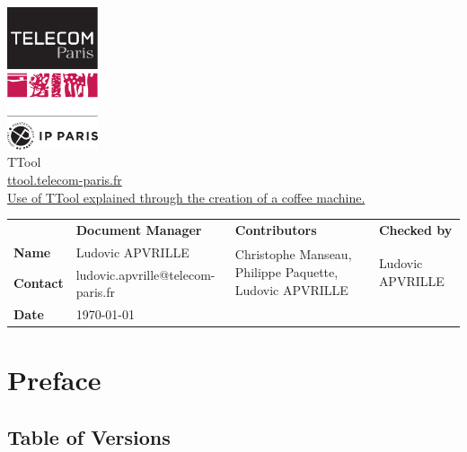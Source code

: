 \documentclass[12pt]{article}
\begin{document}
\sloppy 

\begin{center}

\includegraphics[width=0.2\textwidth]{fig/tp}
\vspace{10 pt}\\
\Huge TTool \\
\vspace{10 pt}
\Large \url{ttool.telecom-paris.fr}
\vspace{20 pt}\\
\underline{\Large Use of TTool explained through the creation of a coffee machine.}
\vspace{30 pt}
\end{center}

\begin{table}[H]
\large
\centering
\begin{adjustbox}{width=\textwidth}
\begin{tabular}{ |p{1.6cm}|p{6.0cm}|p{4.2cm}|p{4.2cm}| }
\hhline{----}
 & \textbf{Document Manager} & \textbf{Contributors}  & \textbf{Checked by}  \\ 
\hhline{----}
\textbf{Name}   & Ludovic APVRILLE & \multirow{2}{4.2cm}{Christophe Manseau, Philippe Paquette,
Ludovic APVRILLE} &
\multirow{2}{*}{Ludovic APVRILLE} \\
\hhline{--~~}
\textbf{Contact} & ludovic.apvrille@telecom-paris.fr &  &  \\ 
\hhline{--~~}
\textbf{Date} & \today &  &  \\ 
\hline
\end{tabular}
\end{adjustbox}
\end{table}

\newpage
\tableofcontents


\newpage
\section{Preface}

\subsection{Table of Versions}
\end{document}
